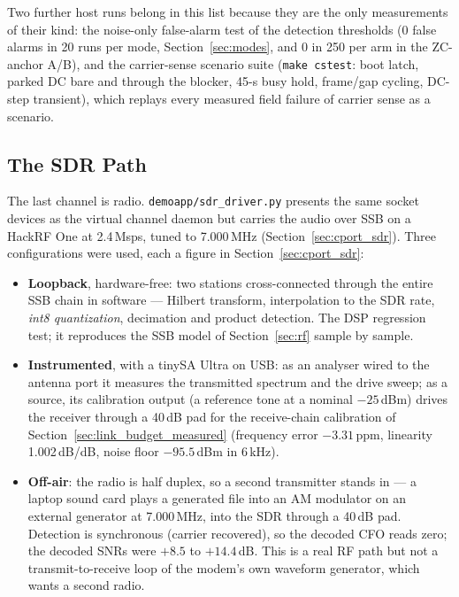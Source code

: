 Two further host runs belong in this list because they are the only
measurements of their kind: the noise-only false-alarm test of the
detection thresholds (0 false alarms in 20 runs per mode,
Section~\ref{sec:modes}, and 0 in 250 per arm in the ZC-anchor A/B),
and the carrier-sense scenario suite (\texttt{make cstest}: boot
latch, parked DC bare and through the blocker, 45-s busy hold,
frame/gap cycling, DC-step transient), which replays every measured
field failure of carrier sense as a scenario.

\subsection{The SDR Path}
\label{sec:chan_sdr}

The last channel is radio.  \texttt{demoapp/sdr\_driver.py} presents
the same socket devices as the virtual channel daemon but carries the
audio over SSB on a HackRF One at 2.4\,Msps, tuned to 7.000\,MHz
(Section~\ref{sec:cport_sdr}).  Three configurations were used, each a
figure in Section~\ref{sec:cport_sdr}:

\begin{itemize}
    \item \textbf{Loopback}, hardware-free: two stations cross-connected
          through the entire SSB chain in software --- Hilbert
          transform, interpolation to the SDR rate, \emph{int8
          quantization}, decimation and product detection.  The DSP
          regression test; it reproduces the SSB model of
          Section~\ref{sec:rf} sample by sample.
    \item \textbf{Instrumented}, with a tinySA Ultra on USB: as an
          analyser wired to the antenna port it measures the
          transmitted spectrum and the drive sweep; as a source, its
          calibration output (a reference tone at a nominal
          $-25$\,dBm) drives the receiver through a 40\,dB pad for the
          receive-chain calibration of Section~\ref{sec:link_budget_measured}
          (frequency error $-3.31$\,ppm, linearity 1.002\,dB/dB, noise
          floor $-95.5$\,dBm in 6\,kHz).
    \item \textbf{Off-air}: the radio is half duplex, so a second
          transmitter stands in --- a laptop sound card plays a
          generated file into an AM modulator on an external generator
          at 7.000\,MHz, into the SDR through a 40\,dB pad.  Detection
          is synchronous (carrier recovered), so the decoded CFO reads
          zero; the decoded SNRs were $+8.5$ to $+14.4$\,dB.  This is a
          real RF path but not a transmit-to-receive loop of the
          modem's own waveform generator, which wants a second radio.
\end{itemize}

